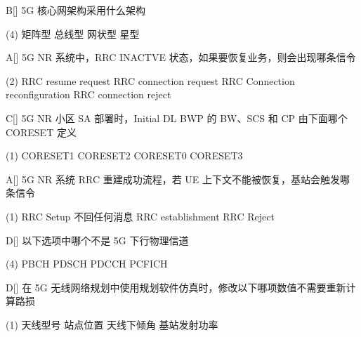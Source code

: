 \begin{choice}{B}[]
    5G 核心网架构采用什么架构
    \begin{tasks}(4)
        \task 矩阵型
        \task 总线型
        \task 网状型
        \task 星型
    \end{tasks}
\end{choice}

\begin{choice}{A}[]
    5G NR 系统中，RRC INACTVE 状态，如果要恢复业务，则会出现哪条信令
    \begin{tasks}(2)
        \task RRC resume request
        \task RRC connection request
        \task RRC Connection reconfiguration
        \task RRC connection reject
    \end{tasks}
\end{choice}




\begin{choice}{C}[]
    5G NR 小区 SA 部署时，Initial DL BWP 的 BW、SCS 和 CP 由下面哪个 CORESET 定义
    \begin{tasks}(1)
        \task CORESET1
        \task CORESET2
        \task CORESET0
        \task CORESET3
    \end{tasks}
\end{choice}


\begin{choice}{A}[]
    5G NR 系统 RRC 重建成功流程，若 UE 上下文不能被恢复，基站会触发哪条信令
    \begin{tasks}(1)
        \task RRC Setup
        \task 不回任何消息
        \task RRC establishment
        \task RRC Reject
    \end{tasks}
\end{choice}


\begin{choice}{D}[]
    以下选项中哪个不是 5G 下行物理信道
    \begin{tasks}(4)
        \task PBCH
        \task PDSCH
        \task  PDCCH
        \task PCFICH
    \end{tasks}
\end{choice}


\begin{choice}{D}[]
    在 5G 无线网络规划中使用规划软件仿真时，修改以下哪项数值不需要重新计算路损
    \begin{tasks}(1)
        \task 天线型号
        \task 站点位置
        \task 天线下倾角
        \task 基站发射功率
    \end{tasks}
\end{choice}

